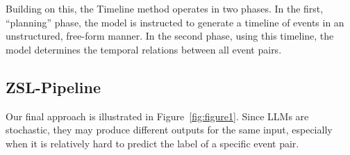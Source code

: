 Building on this, the Timeline method operates in two phases. In the first, ``planning'' phase, the model is instructed to generate a timeline of events in an unstructured, free-form manner. In the second phase, using this timeline, the model determines the temporal relations between all event pairs.



\subsection{ZSL-Pipeline}
\label{section:model:pipeline}


Our final approach is illustrated in Figure~\ref{fig:figure1}. Since LLMs are stochastic, they may produce different outputs for the same input, especially when it is relatively hard to predict the label of a specific event pair.  

